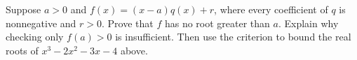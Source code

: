 Suppose $a>0$ and $f(x)=(x-a)q(x)+r$, where every coefficient of $q$ is nonnegative and $r>0$. Prove that $f$ has no root greater than $a$. Explain why checking only $f(a)>0$ is insufficient. Then use the criterion to bound the real roots of $x^3-2x^2-3x-4$ above.
